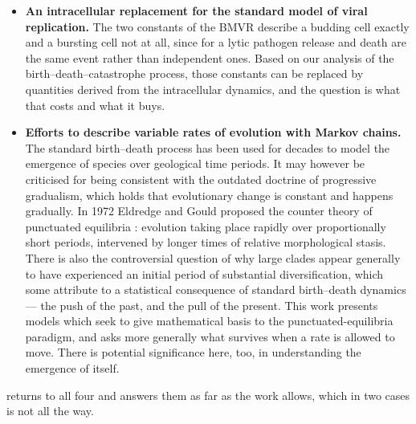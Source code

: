 \begin{itemize}
\item \textbf{An intracellular replacement for the standard model of viral
replication.} The two constants of the BMVR describe a budding cell exactly and
a bursting cell not at all, since for a lytic pathogen release and death are
the same event rather than independent ones. Based on our analysis of the
birth--death--catastrophe process, those constants can be replaced by
quantities derived from the intracellular dynamics, and the question is what
that costs and what it buys.

\item \textbf{Efforts to describe variable rates of evolution with Markov
chains.} The standard birth--death process has been used for decades to model
the emergence of species over geological time periods. It may however be
criticised for being consistent with the outdated doctrine of progressive
gradualism, which holds that evolutionary change is constant and happens
gradually. In 1972 Eldredge and Gould proposed the counter theory of punctuated
equilibria \cite{eldredge1972punctuated}: evolution taking place rapidly over
proportionally short periods, intervened by longer times of relative
morphological stasis. There is also the controversial question of why large
clades appear generally to have experienced an initial period of substantial
diversification, which some attribute to a statistical consequence of standard
birth--death dynamics --- the push of the past, and the pull of the present.
This work presents models which seek to give mathematical basis to the
punctuated-equilibria paradigm, and asks more generally what survives when a
rate is allowed to move. There is potential significance here, too, in
understanding the emergence of \yp{} itself.
\end{itemize}

\noindent
{} returns to all four and answers them as
far as the work allows, which in two cases is not all the way.
